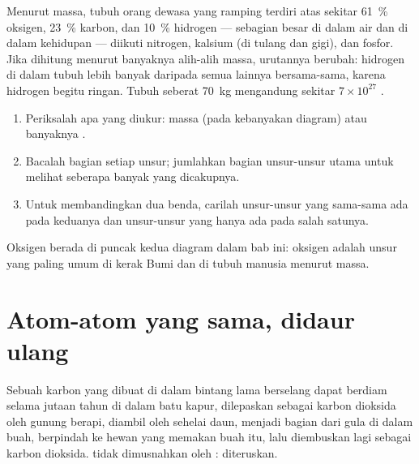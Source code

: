 \begin{proposition}\label{prop:g9:elements-universe-earth:body}
Menurut massa, tubuh orang dewasa yang ramping terdiri atas sekitar
\qty{61}{\percent} oksigen, \qty{23}{\percent} karbon, dan
\qty{10}{\percent} hidrogen --- sebagian besar di dalam air dan di dalam
 kehidupan --- diikuti nitrogen, kalsium (di tulang dan
gigi), dan fosfor. Jika dihitung menurut banyaknya  alih-alih massa,
urutannya berubah:  hidrogen di dalam tubuh lebih banyak daripada
semua  lainnya bersama-sama, karena  hidrogen begitu ringan.
Tubuh seberat \qty{70}{kg} mengandung sekitar $7 \times 10^{27}$ .
\end{proposition}

\begin{method}\label{met:g9:elements-universe-earth:read}
\begin{enumerate}
  \item Periksalah apa yang diukur: massa (pada kebanyakan diagram) atau
        banyaknya .
  \item Bacalah bagian setiap unsur; jumlahkan bagian unsur-unsur utama
        untuk melihat seberapa banyak yang dicakupnya.
  \item Untuk membandingkan dua benda, carilah unsur-unsur yang sama-sama
        ada pada keduanya dan unsur-unsur yang hanya ada pada salah satunya.
\end{enumerate}
Oksigen berada di puncak kedua diagram dalam bab ini: oksigen adalah
unsur yang paling umum di kerak Bumi dan di tubuh manusia menurut massa.
\end{method}

\section{Atom-atom yang sama, didaur ulang}

\begin{example}\label{ex:g9:elements-universe-earth:journey}
Sebuah  karbon yang dibuat di dalam bintang lama berselang dapat
berdiam selama jutaan tahun di dalam batu kapur, dilepaskan sebagai
karbon dioksida oleh gunung berapi, diambil oleh sehelai daun, menjadi
bagian dari gula di dalam buah, berpindah ke hewan yang memakan buah
itu, lalu diembuskan lagi sebagai karbon dioksida.  tidak dimusnahkan
oleh :  diteruskan.
\end{example}

